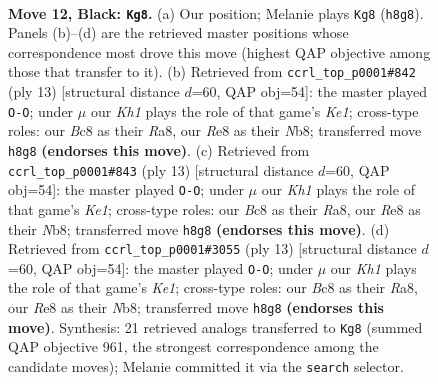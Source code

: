 \documentclass[11pt]{article}
\begin{document}
\clearpage

\begin{figure}[p]\centering
\begin{subfigure}{0.46\textwidth}\centering
\resizebox{\linewidth}{!}{%
\newchessgame
\chessboard[
  setfen={rnbqr2k/p5pp/2pb1n2/1p1p1p2/3P1B2/5NP1/PPQ1PPBP/RN3RK1 b - - 5 12},
  showmover=false,
  pgfstyle=straightmove, color=movearrow, markmove={h8-g8}
]}
\caption{}
\end{subfigure}\hfill
\begin{subfigure}{0.46\textwidth}\centering
\resizebox{\linewidth}{!}{%
\newchessgame
\chessboard[
  setfen={rnbqk2r/pp2bppp/2p2n2/3p4/2PQ4/5NP1/PP2PPBP/RNB2RK1 b kq - 3 7},
  showmover=false,
  pgfstyle=straightmove, color=movearrow, markmove={e8-g8}
]}
\caption{}
\end{subfigure}
\\[4pt]
\begin{subfigure}{0.46\textwidth}\centering
\resizebox{\linewidth}{!}{%
\newchessgame
\chessboard[
  setfen={rnbqk2r/pp2bppp/2p2n2/3p4/2PQ4/5NP1/PP2PPBP/RNB2RK1 b kq - 3 7},
  showmover=false,
  pgfstyle=straightmove, color=movearrow, markmove={e8-g8}
]}
\caption{}
\end{subfigure}\hfill
\begin{subfigure}{0.46\textwidth}\centering
\resizebox{\linewidth}{!}{%
\newchessgame
\chessboard[
  setfen={rnbqk2r/pp2bppp/2p2n2/3p4/2PQ4/5NP1/PP2PPBP/RNB2RK1 b kq - 3 7},
  showmover=false,
  pgfstyle=straightmove, color=movearrow, markmove={e8-g8}
]}
\caption{}
\end{subfigure}
\caption{\textbf{Move 12, Black: \texttt{Kg8}.} (a) Our position; Melanie plays \texttt{Kg8} (\texttt{h8g8}). Panels (b)--(d) are the retrieved master positions whose correspondence most drove this move (highest QAP objective among those that transfer to it). (b) Retrieved from \texttt{ccrl\_top\_p0001\#842} (ply 13) [structural distance $d$=60, QAP obj=54]: the master played \texttt{O-O}; under $\mu$ our \emph{Kh1} plays the role of that game's \emph{Ke1}; cross-type roles: our \emph{B}c8 as their \emph{R}a8, our \emph{R}e8 as their \emph{N}b8; transferred move \texttt{h8g8} \textbf{(endorses this move)}. (c) Retrieved from \texttt{ccrl\_top\_p0001\#843} (ply 13) [structural distance $d$=60, QAP obj=54]: the master played \texttt{O-O}; under $\mu$ our \emph{Kh1} plays the role of that game's \emph{Ke1}; cross-type roles: our \emph{B}c8 as their \emph{R}a8, our \emph{R}e8 as their \emph{N}b8; transferred move \texttt{h8g8} \textbf{(endorses this move)}. (d) Retrieved from \texttt{ccrl\_top\_p0001\#3055} (ply 13) [structural distance $d$=60, QAP obj=54]: the master played \texttt{O-O}; under $\mu$ our \emph{Kh1} plays the role of that game's \emph{Ke1}; cross-type roles: our \emph{B}c8 as their \emph{R}a8, our \emph{R}e8 as their \emph{N}b8; transferred move \texttt{h8g8} \textbf{(endorses this move)}. Synthesis: 21 retrieved analogs transferred to \texttt{Kg8} (summed QAP objective 961, the strongest correspondence among the candidate moves); Melanie committed it via the \texttt{search} selector.}
\label{fig:thought-m23}
\end{figure}
\end{document}
